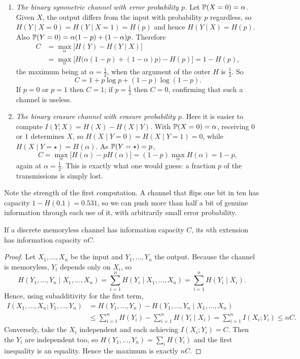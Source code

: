 \documentclass[a4paper]{scrartcl}
\begin{document}
\begin{example}\label{ex:capacities}
	\begin{enumerate}[label=(\roman*)]
		\item \emph{The binary symmetric channel with error probability $p$.} Let $\mathbb{P}(X=0)=\alpha$. Given $X$, the output differs from the input with probability $p$ regardless, so $H(Y\mid X=0)=H(Y\mid X=1)=H(p)$ and hence $H(Y\mid X) = H(p)$. Also $\mathbb{P}(Y=0) = \alpha(1-p)+(1-\alpha)p$. Therefore
		\begin{align*}
			C &= \max_\alpha\bigl[H(Y)-H(Y\mid X)\bigr]\\
			&= \max_\alpha \bigl[H\bigl(\alpha(1-p)+(1-\alpha)p\bigr)-H(p)\bigr] = 1-H(p),
		\end{align*}
		the maximum being at $\alpha = \tfrac12$, when the argument of the outer $H$ is $\tfrac12$. So
		$$C = 1 + p\log p + (1-p)\log(1-p).$$
		If $p = 0$ or $p=1$ then $C=1$; if $p = \tfrac12$ then $C = 0$, confirming that such a channel is useless.
		\item \emph{The binary erasure channel with erasure probability $p$.} Here it is easier to compute $I(Y;X) = H(X)-H(X\mid Y)$. With $\mathbb{P}(X=0)=\alpha$, receiving $0$ or $1$ determines $X$, so $H(X\mid Y=0)=H(X\mid Y=1)=0$, while $H(X\mid Y=\star) = H(\alpha)$. As $\mathbb{P}(Y=\star)=p$,
		$$C = \max_\alpha\bigl[H(\alpha)-pH(\alpha)\bigr] = (1-p)\max_\alpha H(\alpha) = 1-p,$$
		again at $\alpha=\tfrac12$. This is exactly what one would guess: a fraction $p$ of the transmissions is simply lost.
	\end{enumerate}
\end{example}

Note the strength of the first computation. A channel that flips one bit in ten has capacity $1-H(0.1) = 0.531$, so we can push more than half a bit of genuine information through each use of it, with arbitrarily small error probability.

\begin{lemma}\label{lem:extcap}
	If a discrete memoryless channel has information capacity $C$, its $n$th extension has information capacity $nC$.
\end{lemma}

\begin{proof}
	Let $X_1,\dots,X_n$ be the input and $Y_1,\dots,Y_n$ the output. Because the channel is memoryless, $Y_i$ depends only on $X_i$, so
	$$H(Y_1,\dots,Y_n\mid X_1,\dots,X_n) = \sum_{i=1}^n H(Y_i\mid X_1,\dots,X_n) = \sum_{i=1}^n H(Y_i\mid X_i).$$
	Hence, using subadditivity for the first term,
	\begin{align*}
		I(X_1,\dots,X_n;Y_1,\dots,Y_n) &= H(Y_1,\dots,Y_n)-H(Y_1,\dots,Y_n\mid X_1,\dots,X_n)\\
		&\le \sum_{i=1}^n H(Y_i)-\sum_{i=1}^n H(Y_i\mid X_i) = \sum_{i=1}^n I(X_i;Y_i) \le nC.
	\end{align*}
	Conversely, take the $X_i$ independent and each achieving $I(X_i;Y_i)=C$. Then the $Y_i$ are independent too, so $H(Y_1,\dots,Y_n) = \sum_i H(Y_i)$ and the first inequality is an equality. Hence the maximum is exactly $nC$.
\end{proof}
\end{document}
